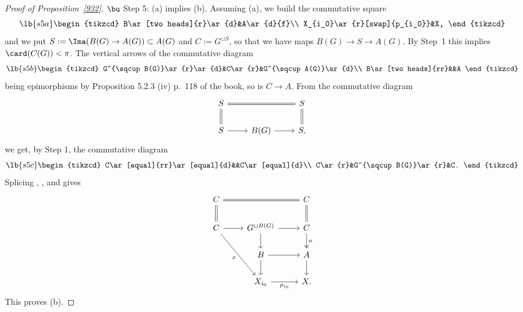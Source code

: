 \documentclass[12pt]{article}
\theoremstyle{remark}
\theoremstyle{definition}
\begin{document}
\begin{proof}[Proof of Proposition~\ref{932}]
\nn$\bu$ Step 5: (a) implies (b). Assuming (a), we build the commutative square 
%
\begin{equation}\lb{s5a}
\begin{tikzcd}
B\ar[two heads]{r}\ar{d}&A\ar{d}{f}\\ 
X_{i_0}\ar{r}[swap]{p_{i_0}}&X,
\end{tikzcd}
\end{equation}
% 
and we put $S:=\Ima(B(G)\to A(G))\subset A(G)$ and $C:=G^{\sqcup S}$, so that we have maps $B(G)\to S\to A(G)$. By Step~1 this implies $\card(C(G))<\pi$. The vertical arrows of the commutative diagram 
%
\begin{equation}\lb{s5b}
\begin{tikzcd}
G^{\sqcup B(G)}\ar{r}\ar{d}&C\ar{r}&G^{\sqcup A(G)}\ar{d}\\ 
B\ar[two heads]{rr}&&A
\end{tikzcd}
\end{equation} 
%
being epimorphisms by Proposition 5.2.3 (iv) p.~118 of the book, so is $C\to A$. From the commutative diagram 
$$
\begin{tikzcd}
S\ar[equal]{rr}\ar[equal]{d}&&S\ar[equal]{d}\\ 
S\ar{r}&B(G)\ar{r}&S,
\end{tikzcd}
$$ 
we get, by Step 1, the commutative diagram 
%
\begin{equation}\lb{s5c}
\begin{tikzcd}
C\ar[equal]{rr}\ar[equal]{d}&&C\ar[equal]{d}\\ 
C\ar{r}&G^{\sqcup B(G)}\ar{r}&C.
\end{tikzcd}
\end{equation} 
%
Splicing , , and  gives 
$$
\begin{tikzcd}
C\ar[equal]{rr}\ar[equal]{d}&&C\ar[equal]{d}\\ 
C\ar{r}\ar{rdd}[swap]{x}&G^{\sqcup B(G)}\ar{r}\ar{d}&C\ar[two heads]{d}{a}\\ 
{}&B\ar{r}\ar{d}&A\ar{d}\\ 
{}&X_{i_0}\ar{r}[swap]{p_{i_0}}&X.
\end{tikzcd}
$$ 
This proves (b).


\end{proof}
\end{document}
